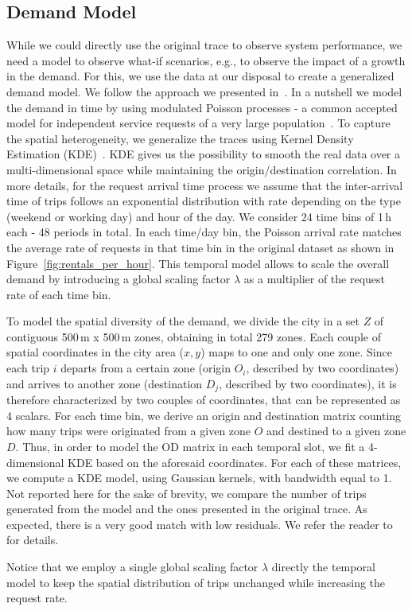 \subsection{Demand Model}
 
While we could directly use the original trace to observe system performance, we need a model to observe what-if scenarios, e.g., to observe the impact of a growth in the demand. For this, we use the data at our disposal to create a generalized demand model. We follow the approach we presented in~\cite{ciociola2020}. In a nutshell we model the demand in time by using modulated Poisson processes - a common accepted model for independent service requests of a very large population~\cite{poisson_inh}. To capture the spatial heterogeneity, we generalize the traces using Kernel Density Estimation (KDE)~\cite{kde_spatial}. KDE gives us the possibility to smooth the real data over a multi-dimensional space while maintaining the origin/destination correlation.
In more details, for the request arrival time process we assume that the inter-arrival time of trips follows an exponential distribution with rate depending on the type (weekend or working day) and hour of the day. We consider 24 time bins of 1\,h each - 48 periods in total. In each time/day bin, the Poisson arrival rate matches the average rate of requests in that time bin in the original dataset as shown in Figure~\ref{fig:rentals_per_hour}. This temporal model allows to scale the overall demand by introducing a global scaling factor $\lambda$ as a multiplier of the request rate of each time bin.

To model the spatial diversity of the demand, we divide the city in a set $Z$ of contiguous 500\,m x 500\,m zones, obtaining in total 279 zones. Each couple of spatial coordinates in the city area  ($x,y$) maps to one and only one zone.  Since each trip $i$ departs from a certain zone (origin $O_i$, described by two coordinates) and arrives to another zone (destination $D_j$, described by two coordinates), it is therefore characterized by two couples of coordinates, that can be represented as 4 scalars. 
For each time bin, we derive an origin and destination matrix counting how many trips were originated from a given zone $O$ and destined to a given zone $D$. Thus, in order to model the OD matrix in each temporal slot, we fit a 4-dimensional KDE based on the aforesaid coordinates.
For each of these matrices, we compute a KDE model, using Gaussian kernels, with bandwidth equal to 1. %
Not reported here for the sake of brevity, we compare the  number of trips generated from the model and the ones presented in the original trace. As expected, there is a very good match with low residuals. We refer the reader to~\cite{ciociola2020} for details.

Notice that we employ a single global scaling factor $\lambda$ directly the temporal model to keep the spatial distribution of trips unchanged while increasing the request rate. 